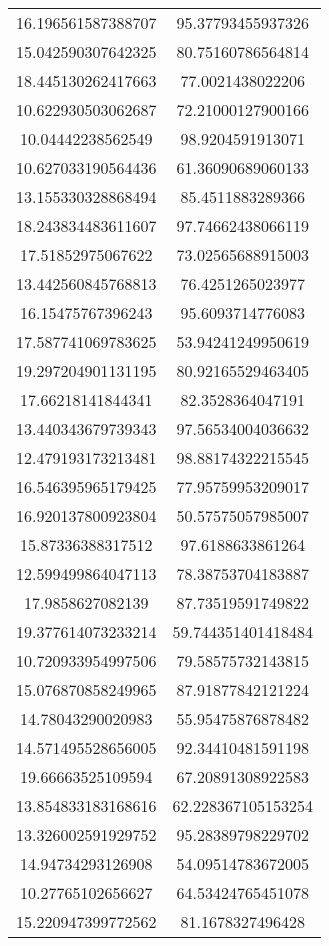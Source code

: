\begin{table}
\begin{tabular}{cc}
16.196561587388707 & 95.37793455937326 \\
15.042590307642325 & 80.75160786564814 \\
18.445130262417663 & 77.0021438022206 \\
10.622930503062687 & 72.21000127900166 \\
10.04442238562549 & 98.9204591913071 \\
10.627033190564436 & 61.36090689060133 \\
13.155330328868494 & 85.4511883289366 \\
18.243834483611607 & 97.74662438066119 \\
17.51852975067622 & 73.02565688915003 \\
13.442560845768813 & 76.4251265023977 \\
16.15475767396243 & 95.6093714776083 \\
17.587741069783625 & 53.94241249950619 \\
19.297204901131195 & 80.92165529463405 \\
17.66218141844341 & 82.3528364047191 \\
13.440343679739343 & 97.56534004036632 \\
12.479193173213481 & 98.88174322215545 \\
16.546395965179425 & 77.95759953209017 \\
16.920137800923804 & 50.57575057985007 \\
15.87336388317512 & 97.6188633861264 \\
12.599499864047113 & 78.38753704183887 \\
17.9858627082139 & 87.73519591749822 \\
19.377614073233214 & 59.744351401418484 \\
10.720933954997506 & 79.58575732143815 \\
15.076870858249965 & 87.91877842121224 \\
14.78043290020983 & 55.95475876878482 \\
14.571495528656005 & 92.34410481591198 \\
19.66663525109594 & 67.20891308922583 \\
13.854833183168616 & 62.228367105153254 \\
13.326002591929752 & 95.28389798229702 \\
14.94734293126908 & 54.09514783672005 \\
10.27765102656627 & 64.53424765451078 \\
15.220947399772562 & 81.1678327496428 \\

\end{tabular}
\end{table}
